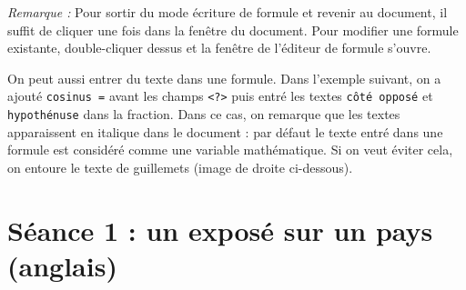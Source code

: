 
\emph{Remarque :} Pour sortir du mode écriture de formule et revenir au document, il suffit de cliquer une fois dans la fenêtre du document. Pour modifier une formule existante, double-cliquer dessus et la fenêtre de l'éditeur de formule s'ouvre.

On peut aussi entrer du texte dans une formule. Dans l'exemple suivant, on a ajouté \texttt{cosinus =} avant les champs \texttt{<?>} puis entré les textes \texttt{côté opposé} et \texttt{hypothénuse} dans la fraction. Dans ce cas, on remarque que les textes apparaissent en italique dans le document : par défaut le texte entré dans une formule est considéré comme une variable mathématique. Si on veut éviter cela, on entoure le texte de guillemets (image de droite ci-dessous).






%
%
%
%

\pagebreak

\section{Séance 1 : un exposé sur un pays (anglais)}\label{ficheTexte4e2}


